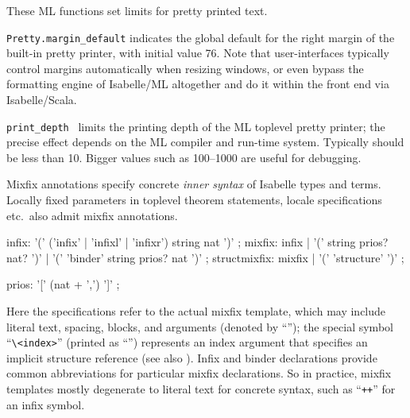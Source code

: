 \begin{isabellebody}
\begin{isamarkuptext}
  These ML functions set limits for pretty printed text.

  \begin{description}

  \item \verb|Pretty.margin_default| indicates the global default for
  the right margin of the built-in pretty printer, with initial value
  76.  Note that user-interfaces typically control margins
  automatically when resizing windows, or even bypass the formatting
  engine of Isabelle/ML altogether and do it within the front end via
  Isabelle/Scala.

  \item \verb|print_depth|~ limits the printing depth of the
  ML toplevel pretty printer; the precise effect depends on the ML
  compiler and run-time system.  Typically  should be less
  than 10.  Bigger values such as 100--1000 are useful for debugging.

  \end{description}%
\end{isamarkuptext}%
\isamarkuptrue%
%
\isamarkuptrue%
%
\begin{isamarkuptext}%
Mixfix annotations specify concrete \emph{inner syntax} of
  Isabelle types and terms.  Locally fixed parameters in toplevel
  theorem statements, locale specifications etc.\ also admit mixfix
  annotations.

  \begin{rail}
    infix: '(' ('infix' | 'infixl' | 'infixr') string nat ')'
    ;
    mixfix: infix | '(' string prios? nat? ')' | '(' 'binder' string prios? nat ')'
    ;
    structmixfix: mixfix | '(' 'structure' ')'
    ;

    prios: '[' (nat + ',') ']'
    ;
  \end{rail}

  Here the  specifications refer to the actual mixfix
  template, which may include literal text, spacing, blocks, and
  arguments (denoted by ``''); the special symbol
  ``\verb|\<index>|'' (printed as ``'') represents an index
  argument that specifies an implicit structure reference (see also
  ).  Infix and binder declarations provide common
  abbreviations for particular mixfix declarations.  So in practice,
  mixfix templates mostly degenerate to literal text for concrete
  syntax, such as ``\verb|++|'' for an infix symbol.


\end{isamarkuptext}
\end{isabellebody}
